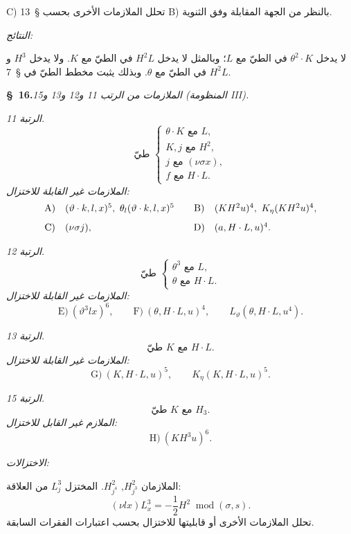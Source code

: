 \documentclass[11pt]{article}
\providecommand{\modu}[1]{\;\operatorname{mod} #1}
\begin{document}
C) تحلل الملازمات الأخرى بحسب \S\ 13 B) بالنظر من الجهة المقابلة وفق الثنوية.

\noindent\emph{النتائج:}

لا يدخل $\theta^2\cdot K$ في الطيّ مع $L$؛ وبالمثل لا يدخل $H^2L$ في الطيّ مع $K$. ولا يدخل $H^3$ و$H^2L$ في الطيّ مع $\theta$. وبذلك يثبت مخطط الطيّ في \S\ 7.

\begin{center}
\textbf{\S\ 16.}\quad\emph{الملازمات من الرتب 11 و12 و13 و15 (المنظومة III).}
\end{center}

\noindent\emph{الرتبة 11.}
\[
\text{طيّ }\left\{\begin{array}{l}
\theta\cdot K\text{ مع }L,\\
K,j\text{ مع }H^2,\\
j\text{ مع }(\nu\sigma x),\\
f\text{ مع }H\cdot L.
\end{array}\right.
\]
\noindent\emph{الملازمات غير القابلة للاختزال:}
\[
\begin{array}{c@{\quad}l@{\qquad}c@{\quad}l}
\text{A)}&(\vartheta\cdot k,l,x)^5,
\ \theta_l(\vartheta\cdot k,l,x)^5&
\text{B)}&(KH^2u)^4,
\ K_\eta(KH^2u)^4,\\[0.8em]
\text{C)}&(\nu\sigma j),&
\text{D)}&(a,H\cdot L,u)^4.
\end{array}
\]

\noindent\emph{الرتبة 12.}
\[
\text{طيّ }\left\{\begin{array}{l}
\theta^3\text{ مع }L,\\
\theta\text{ مع }H\cdot L.
\end{array}\right.
\]
\noindent\emph{الملازمات غير القابلة للاختزال:}
\[
\text{E)}\ (\vartheta^3lx)^6,
\qquad
\text{F)}\ (\theta,H\cdot L,u)^4,
\qquad L_\vartheta(\theta,H\cdot L,u^4).
\]

\noindent\emph{الرتبة 13.}
\[
\text{طيّ }K\text{ مع }H\cdot L.
\]
\noindent\emph{الملازمات غير القابلة للاختزال:}
\[
\text{G)}\ (K,H\cdot L,u)^5,
\qquad K_\eta(K,H\cdot L,u)^5.
\]

\noindent\emph{الرتبة 15.}
\[
\text{طيّ }K\text{ مع }H_3.
\]
\noindent\emph{الملازم غير القابل للاختزال:}
\[
\text{H)}\ (KH^3u)^6.
\]

\noindent\emph{الاختزالات:}

الملازمان $H_{j^3}^2$, $H_{j^4}^2$. المختزل $L_j^3$ من العلاقة:
\[
(\nu lx)L_x^3=-\frac12H^2\modu{(\sigma,s)}.
\]
تحلل الملازمات الأخرى أو قابليتها للاختزال بحسب اعتبارات الفقرات السابقة.
\end{document}
